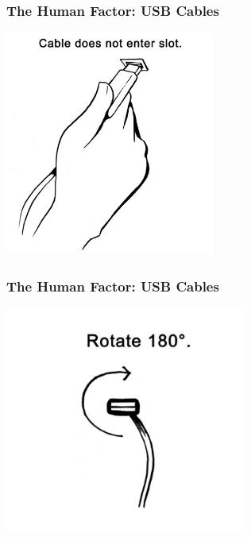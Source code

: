 \begin{frame}
\frametitle{The Human Factor: USB Cables}
\begin{changemargin}{1cm}

\vspace{-0.5em}
\begin{center}
	\includegraphics[height=20em]{images/usb1.png}\\
\end{center}

\end{changemargin}
\end{frame}

\begin{frame}
\frametitle{The Human Factor: USB Cables}
\begin{changemargin}{1cm}

\vspace{-0.5em}
\begin{center}
	\includegraphics[height=20em]{images/usb2.png}\\
\end{center}

\end{changemargin}
\end{frame}


